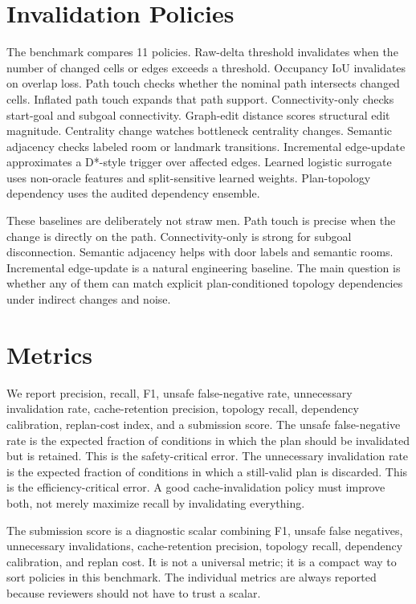 \documentclass{article}
\begin{document}
\section{Invalidation Policies}

The benchmark compares 11 policies. Raw-delta threshold invalidates when the number of changed cells or edges exceeds a threshold. Occupancy IoU invalidates on overlap loss. Path touch checks whether the nominal path intersects changed cells. Inflated path touch expands that path support. Connectivity-only checks start-goal and subgoal connectivity. Graph-edit distance scores structural edit magnitude. Centrality change watches bottleneck centrality changes. Semantic adjacency checks labeled room or landmark transitions. Incremental edge-update approximates a D*-style trigger over affected edges. Learned logistic surrogate uses non-oracle features and split-sensitive learned weights. Plan-topology dependency uses the audited dependency ensemble.

These baselines are deliberately not straw men. Path touch is precise when the change is directly on the path. Connectivity-only is strong for subgoal disconnection. Semantic adjacency helps with door labels and semantic rooms. Incremental edge-update is a natural engineering baseline. The main question is whether any of them can match explicit plan-conditioned topology dependencies under indirect changes and noise.

\section{Metrics}

We report precision, recall, F1, unsafe false-negative rate, unnecessary invalidation rate, cache-retention precision, topology recall, dependency calibration, replan-cost index, and a submission score. The unsafe false-negative rate is the expected fraction of conditions in which the plan should be invalidated but is retained. This is the safety-critical error. The unnecessary invalidation rate is the expected fraction of conditions in which a still-valid plan is discarded. This is the efficiency-critical error. A good cache-invalidation policy must improve both, not merely maximize recall by invalidating everything.

The submission score is a diagnostic scalar combining F1, unsafe false negatives, unnecessary invalidations, cache-retention precision, topology recall, dependency calibration, and replan cost. It is not a universal metric; it is a compact way to sort policies in this benchmark. The individual metrics are always reported because reviewers should not have to trust a scalar.
\end{document}

